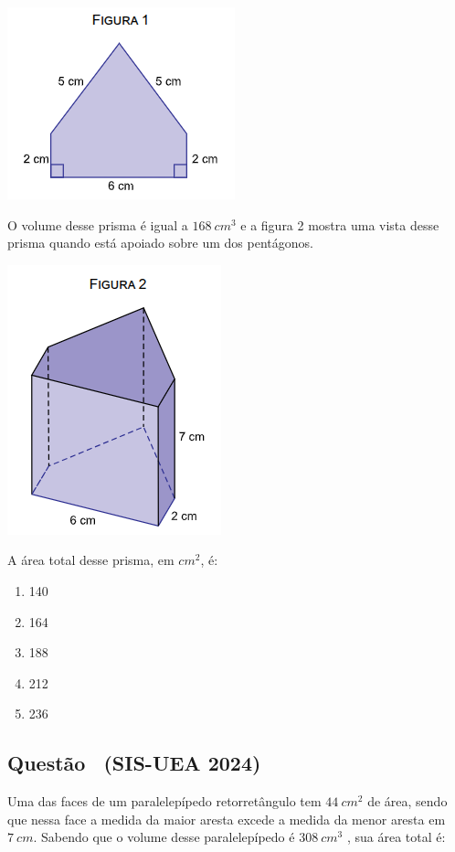 \documentclass[12pt]{article}
\newcounter{questao}
\newcommand{\novaquestao}[1]{%
  \stepcounter{questao}%
  \subsection*{Questão \thequestao\ (#1)}%
}
\begin{document}
\begin{multicols}{2}
            \begin{center}
                \includegraphics[scale=0.6]{imagem/q1-fig1.png}
            \end{center} O volume desse prisma é igual a $168\ cm^{3}$ e a figura 2 mostra uma vista desse prisma quando está apoiado sobre um dos pentágonos.

            \begin{center}
                \includegraphics[scale=0.6]{imagem/q1-fig2.png} 
            \end{center} A área total desse prisma, em $cm^{2}$, é:
        
            \begin{enumerate}[label=(\alph*), noitemsep]
                \item 140
                \item 164
                \item {188} %
                \item 212
                \item 236
            \end{enumerate}

        \novaquestao{SIS-UEA 2024}
            Uma das faces de um paralelepípedo retorretângulo tem $44\ cm^{2}$ de área, sendo que nessa face a medida da maior aresta excede a medida da menor aresta em $7\ cm$. Sabendo que o volume desse paralelepípedo é $308\ cm^{3}$ , sua área total é:


\end{multicols}
\end{document}
